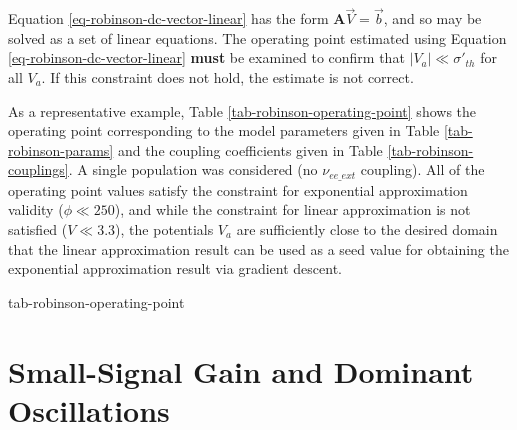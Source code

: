 Equation \ref{eq-robinson-dc-vector-linear} has the form
$\mathbf{A} \vec{V} = \vec{b}$, and so may be solved as a set of linear
equations. The operating point estimated using Equation
\ref{eq-robinson-dc-vector-linear} \textbf{must} be examined to confirm
that $|V_a| \ll \sigma'_{th}$ for all $V_a$. If this constraint does not
hold, the estimate is not correct.

As a representative example, Table \ref{tab-robinson-operating-point} shows
the operating point corresponding to the model parameters given in Table
\ref{tab-robinson-params} and the coupling coefficients given in Table
\ref{tab-robinson-couplings}. A single population was considered (no
$\nu_{ee\_ext}$ coupling). All of the operating point values satisfy the
constraint for exponential approximation validity ($\phi \ll 250$), and
while the constraint for linear approximation is not satisfied
($V \ll 3.3$), the potentials $V_a$ are sufficiently close to the desired
domain that the linear approximation result can be used as a seed value for
obtaining the exponential approximation result via gradient descent.

{tab-robinson-operating-point}

%
%
\section{Small-Signal Gain and Dominant Oscillations}
\label{sect-robinson-math-gain}

